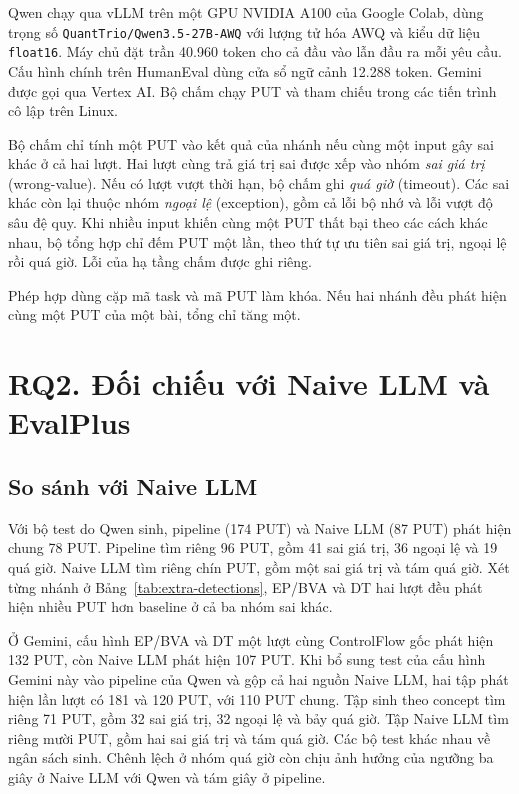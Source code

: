Qwen chạy qua vLLM trên một GPU NVIDIA A100 của Google Colab, dùng trọng số \nolinkurl{QuantTrio/Qwen3.5-27B-AWQ} với lượng tử hóa AWQ và kiểu dữ liệu \texttt{float16}. Máy chủ đặt trần 40.960 token cho cả đầu vào lẫn đầu ra mỗi yêu cầu. Cấu hình chính trên HumanEval dùng cửa sổ ngữ cảnh 12.288 token. Gemini được gọi qua Vertex AI. Bộ chấm chạy PUT và tham chiếu trong các tiến trình cô lập trên Linux.

Bộ chấm chỉ tính một PUT vào kết quả của nhánh nếu cùng một input gây sai khác ở cả hai lượt. Hai lượt cùng trả giá trị sai được xếp vào nhóm \textit{sai giá trị} (wrong-value). Nếu có lượt vượt thời hạn, bộ chấm ghi \textit{quá giờ} (timeout). Các sai khác còn lại thuộc nhóm \textit{ngoại lệ} (exception), gồm cả lỗi bộ nhớ và lỗi vượt độ sâu đệ quy. Khi nhiều input khiến cùng một PUT thất bại theo các cách khác nhau, bộ tổng hợp chỉ đếm PUT một lần, theo thứ tự ưu tiên sai giá trị, ngoại lệ rồi quá giờ. Lỗi của hạ tầng chấm được ghi riêng.

Phép hợp dùng cặp mã task và mã PUT làm khóa. Nếu hai nhánh đều phát hiện cùng một PUT của một bài, tổng chỉ tăng một.



\section{RQ2. Đối chiếu với Naive LLM và EvalPlus}
\label{sec:naive-comparison}

\subsection{So sánh với Naive LLM}

Với bộ test do Qwen sinh, pipeline (174 PUT) và Naive LLM (87 PUT) phát hiện chung 78 PUT. Pipeline tìm riêng 96 PUT, gồm 41 sai giá trị, 36 ngoại lệ và 19 quá giờ. Naive LLM tìm riêng chín PUT, gồm một sai giá trị và tám quá giờ. Xét từng nhánh ở Bảng~\ref{tab:extra-detections}, EP/BVA và DT hai lượt đều phát hiện nhiều PUT hơn baseline ở cả ba nhóm sai khác.

Ở Gemini, cấu hình EP/BVA và DT một lượt cùng ControlFlow gốc phát hiện 132 PUT, còn Naive LLM phát hiện 107 PUT. Khi bổ sung test của cấu hình Gemini này vào pipeline của Qwen và gộp cả hai nguồn Naive LLM, hai tập phát hiện lần lượt có 181 và 120 PUT, với 110 PUT chung. Tập sinh theo concept tìm riêng 71 PUT, gồm 32 sai giá trị, 32 ngoại lệ và bảy quá giờ. Tập Naive LLM tìm riêng mười PUT, gồm hai sai giá trị và tám quá giờ. Các bộ test khác nhau về ngân sách sinh. Chênh lệch ở nhóm quá giờ còn chịu ảnh hưởng của ngưỡng ba giây ở Naive LLM với Qwen và tám giây ở pipeline.


